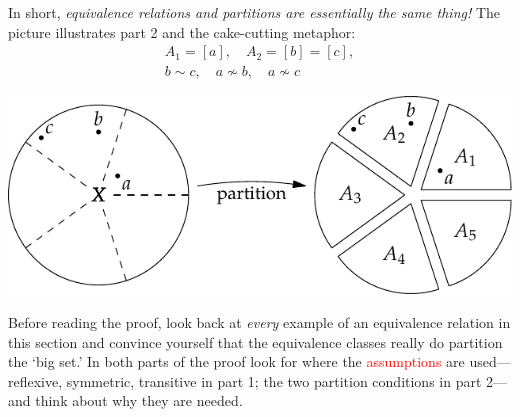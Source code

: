 \begin{minipage}[t]{0.5\linewidth}\vspace{-3pt}
	In short, \emph{equivalence relations and partitions are essentially the same thing!} The picture illustrates part 2 and the cake-cutting metaphor:
	\begin{gather*}
		A_1=[a],\quad A_2=[b]=[c],\\[3pt]
		b\sim c,\quad a\nsim b, \quad a\nsim c
	\end{gather*}
\end{minipage}
\hfill
\begin{minipage}[t]{0.49\linewidth}\vspace{-6pt}
	\hfill
	\includegraphics[scale=1]{relations-08-part}
\end{minipage}
\medbreak

Before reading the proof, look back at \emph{every} example of an equivalence relation in this section and convince yourself that the equivalence classes really do partition the `big set.' In both parts of the proof look for where the \textcolor{red}{assumptions} are used---reflexive, symmetric, transitive in part 1; the two partition conditions in part 2---and think about why they are needed.

\goodbreak


